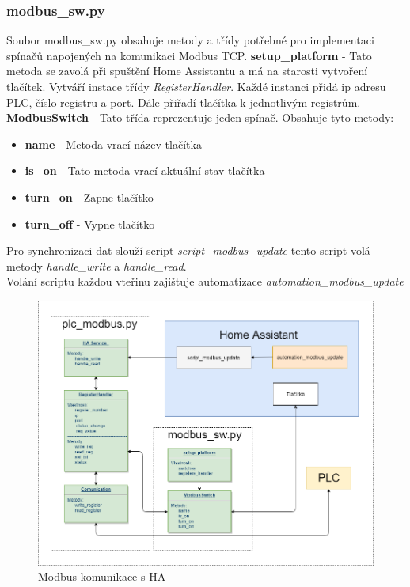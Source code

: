 \documentclass[a4paper,12pt,czech,bibliography=totoc]{scrbook}
\begin{document}
\subsubsection{modbus\_sw.py}
Soubor modbus\_sw.py obsahuje metody a třídy potřebné pro implementaci spínačů napojených na komunikaci Modbus TCP.
\newline
\textbf{setup\_platform} - Tato metoda se zavolá při spuštění Home Assistantu a má na starosti vytvoření tlačítek. Vytváří instace třídy \textit{RegisterHandler}. Každé instanci přidá ip adresu PLC, číslo registru a port. Dále přiřadí tlačítka k jednotlivým registrům.
\newline
\textbf{ModbusSwitch} - Tato třída reprezentuje jeden spínač. Obsahuje tyto metody:
\begin{itemize}
	\item \textbf{name} - Metoda vrací název tlačítka
	\item \textbf{is\_on} - Tato metoda vrací aktuální stav tlačítka
	\item \textbf{turn\_on} - Zapne tlačítko
	\item \textbf{turn\_off} - Vypne tlačítko
\end{itemize}

Pro synchronizaci dat slouží script \textit{script\_modbus\_update} tento script volá metody \textit{handle\_write} a \textit{handle\_read}.\\ Volání scriptu každou vteřinu zajištuje automatizace \textit{automation\_modbus\_update}  


\begin{figure}[h]
	\centering
	\includegraphics[scale = 0.5]{modbusDiagram.PNG}
	\caption{Modbus komunikace s HA}
	\label{fig:my_label}
\end{figure}
\end{document}
